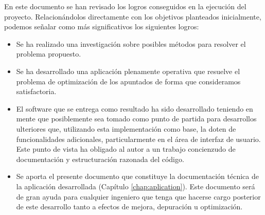 En este documento se han revisado los logros conseguidos en la ejecución del proyecto. 
Relacionándolos directamente con los objetivos planteados inicialmente, podemos
señalar como más significativos los siguientes logros:

\begin{itemize}
\item Se ha realizado una investigación sobre posibles métodos para resolver el problema propuesto.
\item Se ha desarrollado una aplicación plenamente operativa que resuelve el problema de optimización de
      los apuntados de forma que consideramos satisfactoria.
\item El software que se entrega como resultado ha sido desarrollado teniendo en mente que posiblemente sea
      tomado como punto de partida para desarrollos ulteriores que, utilizando esta implementación como base,
			la doten de funcionalidades adicionales, particularmente en el área de interfaz de usuario.
			Este punto de vista ha obligado al autor a un trabajo concienzudo de documentación y estructuración
			razonada del código.
\item Se aporta el presente documento que constituye la documentación técnica de la aplicación desarrollada (Capítulo \ref{chap:aplication}).
      Este documento será de gran ayuda para cualquier ingeniero que tenga que hacerse cargo posterior de este desarrollo
			tanto a efectos de mejora, depuración u optimización.
\end{itemize}

